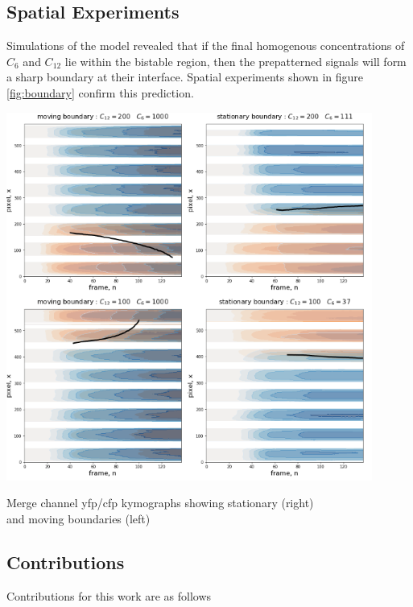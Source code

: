 \subsection{Spatial Experiments}
Simulations of the model revealed that if the final homogenous concentrations
of $C_6$ and $C_{12}$ lie within the bistable region, then the prepatterned
signals will form a sharp boundary at their interface. Spatial experiments
shown in figure \ref{fig:boundary} confirm this prediction.
\begin{Figure}
\includegraphics[width=120mm]{figures/spatial.png}
\caption{Merge channel yfp/cfp kymographs showing stationary (right)\\and moving boundaries (left)}
\label{fig:boundary}
\end{Figure}

\subsection{Contributions}
Contributions for this work are as follows

